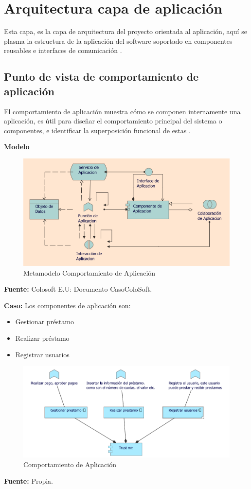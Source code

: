 \section{Arquitectura capa de aplicación}
{Esta capa, es la capa de arquitectura del proyecto orientada al aplicación, aquí se plasma la estructura de la aplicación del software soportado en componentes reusables e interfaces de comunicación \cite{archimate}.}

	\subsection{Punto de vista de comportamiento de aplicación}
	{ El comportamiento de aplicación muestra cómo se componen internamente una aplicación, es útil para diseñar el comportamiento principal del sistema o componentes, e identificar la superposición funcional de estas \cite{archimate}.\\
	\newpage
		
		\textbf{Modelo}\\
		\begin{figure}[H]
			\centering
			\includegraphics[width=0.8\linewidth]{development/comportamientoapp.png}
			\caption{Metamodelo Comportamiento de Aplicación}
		\end{figure}
		\begin{center}
			\textbf{Fuente:} Colosoft E.U: Documento CasoColoSoft.
		\end{center}
		\hfill \break
			
		\textbf{Caso:} Los componentes de aplicación son:
		
		\begin{itemize}
			\item Gestionar préstamo
			\item Realizar préstamo
			\item Registrar usuarios
		\end{itemize}
		
		\begin{figure}[H]
			\centering
			\includegraphics[width=0.6\linewidth]{development/comportamientoapp.pdf}
			\caption{Comportamiento de Aplicación}
		\end{figure}
		\begin{center}
			\textbf{Fuente:} Propia.
		\end{center}
	}
	
